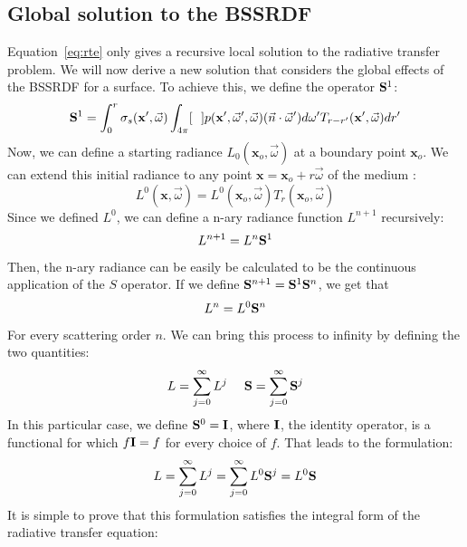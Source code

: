\subsection{Global solution to the BSSRDF}
Equation~\ref{eq:rte} only gives a recursive local solution to the radiative transfer problem. We will now derive a new solution that considers the global effects of the BSSRDF for a surface.  To achieve this, we define the operator $\mathbf{S}^1$:
\begin{equation*}
\mathbf{S}^1 = \int_0^r \sigma_s(\mathbf{x}', \vec{\omega}) \int_{4\pi} [\ \ ] p(\mathbf{x}', \vec{\omega}', \vec{\omega})  (\vec{n} \cdot \vec{\omega}')  d\omega' T_{r-r'}(\mathbf{x}', \vec{\omega})  dr'
\end{equation*}
Now, we can define a starting radiance $L_0(\mathbf{x}_o, \vec{\omega})$ at a boundary point $\mathbf{x}_o$. We can extend this initial radiance to any point $\mathbf{x} = \mathbf{x}_o + r \vec{\omega}$ of the medium :
\begin{equation*}
L^0(\mathbf{x}, \vec{\omega}) = L^0(\mathbf{x}_o, \vec{\omega}) T_r(\mathbf{x}_o, \vec{\omega})
\end{equation*}
Since we defined $L^0$, we can define a n-ary radiance function $L^{n+1}$ recursively:
\begin{equation*}
L^{n+1} = L^n \mathbf{S}^1
\end{equation*}
Then, the n-ary radiance can be easily be calculated to be the continuous application of the $S$ operator. If we define $\mathbf{S}^{n+1} = \mathbf{S}^1 \mathbf{S}^n$, we get that 
\begin{equation*}
L^n = L^0 \mathbf{S}^n
\end{equation*}
For every scattering order $n$.
We can bring this process to infinity by defining the two quantities:
\begin{equation*}
L = \sum_{j=0}^\infty L^j\ \ \ \ \operator{S} = \sum_{j=0}^\infty \operator{S}^j
\end{equation*}
In this particular case, we define $\mathbf{S}^0 = \mathbf{I}$, where $\mathbf{I}$, the identity operator, is a functional for which $f \mathbf{I} = f$ for every choice of $f$.
That leads to the formulation:
\begin{equation*}
L =  \sum_{j=0}^\infty L^j = \sum_{j=0}^\infty L^0 \mathbf{S}^j = L^0 \mathbf{S}
\end{equation*}
It is simple to prove that this formulation satisfies the integral form of the radiative transfer equation:
